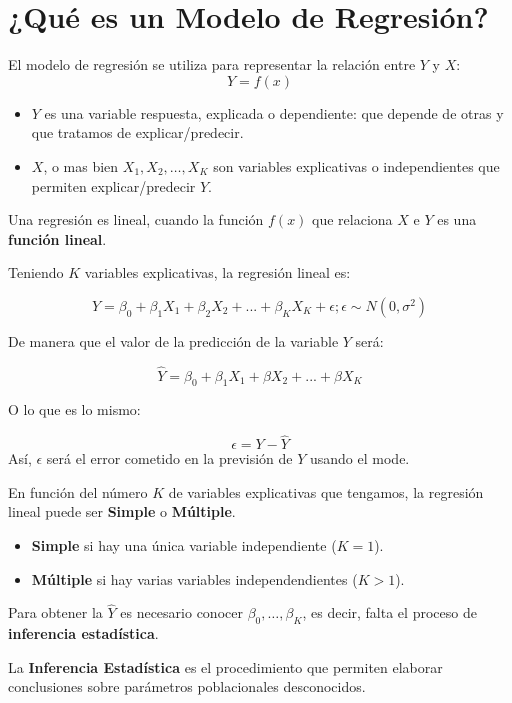 \documentclass[]{book}
\providecommand{\tightlist}{%
  \setlength{\itemsep}{0pt}\setlength{\parskip}{0pt}}
\begin{document}
\hypertarget{que-es-un-modelo-de-regresion}{%
\section{¿Qué es un Modelo de Regresión?}\label{que-es-un-modelo-de-regresion}}

El modelo de regresión se utiliza para representar la relación entre \(Y\) y \(X\):
\[Y = f(x)\]

\begin{itemize}
\tightlist
\item
  \(Y\) es una variable respuesta, explicada o dependiente: que depende de otras y que tratamos de explicar/predecir.
\item
  \(X\), o mas bien \(X_1, X_2, \ldots, X_K\) son variables explicativas o independientes que permiten explicar/predecir \(Y\).
\end{itemize}

Una regresión es lineal, cuando la función \(f(x)\) que relaciona \(X\) e \(Y\) es una \textbf{función lineal}.

Teniendo \(K\) variables explicativas, la regresión lineal es:

\[ Y = \beta_0  + \beta_1 X_1 + \beta_2 X_2 + ... + \beta_K X_K + \epsilon; \epsilon \sim N(0,\sigma^2) \]

De manera que el valor de la predicción de la variable \(Y\) será:

\[ \hat{Y}  = \beta_0  + \beta_1 X_1 + \beta X_2 + ... + \beta X_K \]

O lo que es lo mismo:

\[  \epsilon = Y - \hat{Y} \]
Así, \(\epsilon\) será el error cometido en la previsión de \(Y\) usando el mode.

En función del número \(K\) de variables explicativas que tengamos, la regresión lineal puede ser \textbf{Simple} o \textbf{Múltiple}.

\begin{itemize}
\tightlist
\item
  \textbf{Simple} si hay una única variable independiente (\(K = 1\)).
\item
  \textbf{Múltiple} si hay varias variables independendientes (\(K > 1\)).
\end{itemize}

Para obtener la \(\hat{Y}\) es necesario conocer \(\beta_0, \ldots, \beta_K\), es decir, falta el proceso de \textbf{inferencia estadística}.

La \textbf{Inferencia Estadística} es el procedimiento que permiten elaborar conclusiones sobre parámetros poblacionales desconocidos.
\end{document}
